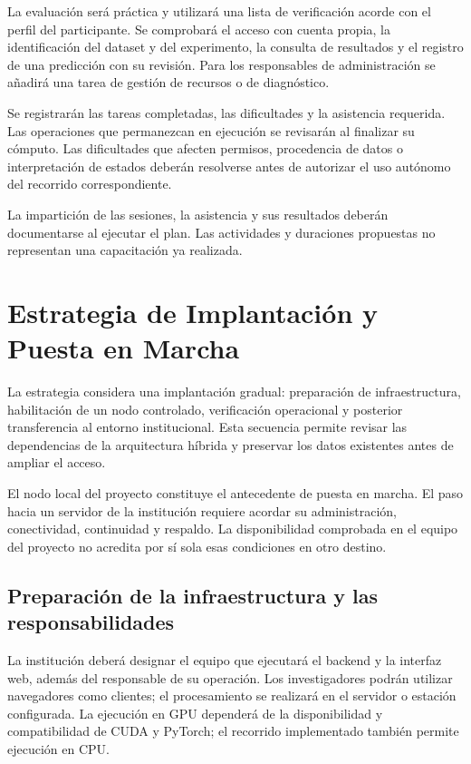 La evaluación será práctica y utilizará una lista de verificación acorde con
el perfil del participante. Se comprobará el acceso con cuenta propia, la
identificación del dataset y del experimento, la consulta de resultados y el
registro de una predicción con su revisión. Para los responsables de
administración se añadirá una tarea de gestión de recursos o de diagnóstico.

Se registrarán las tareas completadas, las dificultades y la asistencia
requerida. Las operaciones que permanezcan en ejecución se revisarán al
finalizar su cómputo. Las dificultades que afecten permisos, procedencia de
datos o interpretación de estados deberán resolverse antes de autorizar el
uso autónomo del recorrido correspondiente.

La impartición de las sesiones, la asistencia y sus resultados deberán
documentarse al ejecutar el plan. Las actividades y duraciones propuestas no
representan una capacitación ya realizada.

\section{Estrategia de Implantación y Puesta en Marcha}
\label{sec:estrategia-implantacion}

La estrategia considera una implantación gradual: preparación de
infraestructura, habilitación de un nodo controlado, verificación operacional
y posterior transferencia al entorno institucional. Esta secuencia permite
revisar las dependencias de la arquitectura híbrida y preservar los datos
existentes antes de ampliar el acceso.

El nodo local del proyecto constituye el antecedente de puesta en marcha. El
paso hacia un servidor de la institución requiere acordar su administración,
conectividad, continuidad y respaldo. La disponibilidad comprobada en el
equipo del proyecto no acredita por sí sola esas condiciones en otro destino.

\subsection{Preparación de la infraestructura y las responsabilidades}

La institución deberá designar el equipo que ejecutará el backend y la
interfaz web, además del responsable de su operación. Los investigadores
podrán utilizar navegadores como clientes; el procesamiento se realizará en
el servidor o estación configurada. La ejecución en GPU dependerá de la
disponibilidad y compatibilidad de CUDA y PyTorch; el recorrido implementado
también permite ejecución en CPU.

